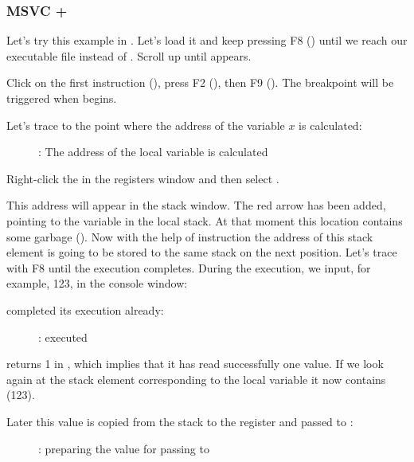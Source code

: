 \clearpage
\subsubsection{MSVC + \olly}
\myindex{\olly}

Let's try this example in \olly.
Let's load it and keep pressing F8 (\stepover) until we reach our executable file instead of .
Scroll up until \main appears.

Click on the first instruction (), press F2 (), then F9 ().
The breakpoint will be triggered when \main begins.

Let's trace to the point where the address of the variable $x$ is calculated:

\begin{figure}[H]
\centering
{}
\caption{\olly: The address of the local variable is calculated}
\label{fig:scanf_ex1_olly_1}
\end{figure}

Right-click the \EAX in the registers window and then select .

This address will appear in the stack window.
The red arrow has been added, pointing to the variable in the local stack.
At that moment this location contains some garbage ().
Now with the help of \PUSH instruction the address of this stack element is going to be stored to the same stack on the next position.
Let's trace with F8 until the \scanf execution completes.
During the \scanf execution, we input, for example, 123, in the console window:



\clearpage
\scanf completed its execution already:

\begin{figure}[H]
\centering
{}
\caption{\olly: \scanf executed}
\label{fig:scanf_ex1_olly_3}
\end{figure}

\scanf returns 1 in \EAX, which implies that it has read successfully one value.
If we look again at the stack element corresponding to the local variable it now contains  (123).

\clearpage

Later this value is copied from the stack to the \ECX register and passed to \printf:

\begin{figure}[H]
\centering
{}
\caption{\olly: preparing the value for passing to \printf}
\label{fig:scanf_ex1_olly_4}
\end{figure}
